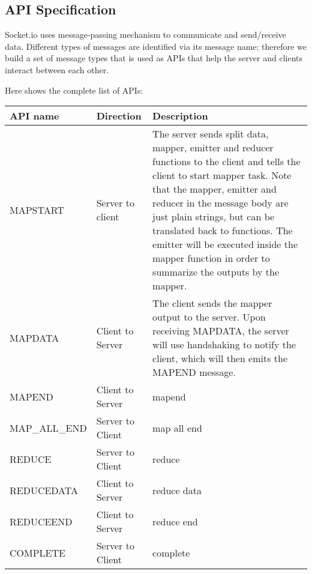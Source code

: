 \subsection{API Specification}

Socket.io uses message-passing mechanism to communicate and send/receive data. Different types of messages are identified via its message name; therefore we build a set of message types that is used as APIs that help the server and clients interact between each other.

Here shows the complete list of APIs:

\begin{center}

\begin{tabular}{| l | l | p{7cm} |}

\hline
API name & Direction & Description \\
\hline
MAPSTART & Server to client & The server sends split data, mapper, emitter and reducer functions to the client and tells the client to start mapper task. \newline
Note that the mapper, emitter and reducer in the message body are just plain strings, but can be translated back to functions. \newline
The emitter will be executed inside the mapper function in order to summarize the outputs by the mapper. \\
\hline
MAPDATA & Client to Server & The client sends the mapper output to the server. \newline
Upon receiving MAPDATA, the server will use handshaking to notify the client, which will then emits the MAPEND message. \\
\hline
MAPEND & Client to Server & mapend \\
\hline
MAP\_ALL\_END & Server to Client & map all end \\
\hline
REDUCE & Server to Client & reduce \\
\hline
REDUCEDATA & Client to Server & reduce data \\
\hline
REDUCEEND & Client to Server & reduce end \\
\hline
COMPLETE & Server to Client & complete \\
\hline

\end{tabular}

\end{center}